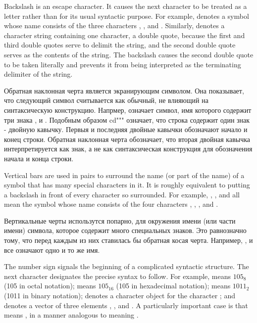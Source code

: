 \begin{indentdesc}{1.2pc}
\item[\cd{{\Xbackslash}}] Backslash is an escape character. 
It causes the next character to be treated as a letter rather than for its usual
syntactic purpose.  For example,  denotes a symbol whose
name consists of the three characters , \cd{(}, and . Similarly,
 denotes a character string containing one character, a
double quote, because the first and third double quotes serve to delimit the
string, and the second double quote serves as the contents of the string.  The
backslash causes the second double quote to be taken literally and prevents it
from being interpreted as the terminating delimiter of the string.

\item[\cd{{\Xbackslash}}] Обратная наклонная черта является экранирующим
символом. Она показывает, что следующий символ считывается как обычный, не
влияющий на синтаксическую конструкцию. Напрмер,  означает
символ, имя которого содержит три знака , \cd{(} и . Подобным
образом  cd{"{\Xbackslash}""} означает, что строка содержит один знак - двойную
кавычку. Первыя и последняя двойные кавычки обозначают начало и конец
строки. Обратная наклонная черта обозначает, что вторая двойная кавычка
интерпретируется как знак, а не как синтаксическая конструкция для обозначения
начала и конца строки.

\item[\cd{|}] Vertical bars are used in pairs
to surround the name (or part of the name) of a symbol that has
many special characters in it.  It is roughly equivalent to putting a
backslash in front of every character so surrounded.  For example,
, , and  all mean the symbol whose name
consists of the four characters , \cd{(}, , and \cd{)}.

\item[\cd{|}] Вертикальные черты использутся попарно, для окружения имени (или
части имени) символа, которое содержит много специальных знаков. Это равнозначно
тому, что перед каждым из них ставилась бы обратная косая
черта. Например, , 
и  все означают одно и то же имя.

\item[\cd{\#}] The number sign signals the beginning of a
complicated syntactic structure.
The next character designates the precise syntax to follow.
For example,  means $105_{8}$ (105 in octal notation);
 means $105_{16}$ (105 in hexadecimal notation);
 means $1011_{2}$ (1011 in binary notation);
 denotes a character object for the character ; and
 denotes a vector of three elements , , and .
A particularly important case is that  means ,
in a manner analogous to  meaning .


\end{indentdesc}
